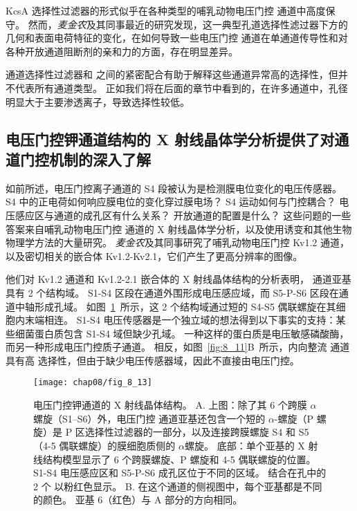 KcsA 选择性过滤器的形式似乎在各种类型的哺乳动物电压门控  通道中高度保守。
然而，\textit{麦金农}及其同事最近的研究发现，这一典型孔道选择性滤过器下方的几何和表面电荷特征的变化，在如何导致一些电压门控  通道在单通道传导性和对各种开放通道阻断剂的亲和力的方面，存在明显差异。


 通道选择性过滤器和  之间的紧密配合有助于解释这些通道异常高的选择性，但并不代表所有通道类型。
正如我们将在后面的章节中看到的，在许多通道中，孔径明显大于主要渗透离子，导致选择性较低。



\subsection{电压门控钾通道结构的 X 射线晶体学分析提供了对通道门控机制的深入了解}

如前所述，电压门控离子通道的 S4 段被认为是检测膜电位变化的电压传感器。
S4 中的正电荷如何响应膜电位的变化穿过膜电场？
S4 运动如何与门控耦合？
电压感应区与通道的成孔区有什么关系？
开放通道的配置是什么？
这些问题的一些答案来自哺乳动物电压门控  通道的 X 射线晶体学分析，以及使用诱变和其他生物物理学方法的大量研究。
\textit{麦金农}及其同事研究了哺乳动物电压门控 Kv1.2  通道，以及密切相关的嵌合体 Kv1.2-Kv2.1，它们产生了更高分辨率的图像。


他们对 Kv1.2 通道和 Kv1.2-2.1 嵌合体的 X 射线晶体结构的分析表明， 通道亚基具有 2 个结构域。
S1-S4 区段在通道外围形成电压感应域，而 S5-P-S6 区段在通道中轴形成孔域。
如图~\ref{fig:8_13}~所示，这 2 个结构域通过短的 S4-S5 偶联螺旋在其细胞内末端相连。
S1-S4 电压传感器是一个独立域的想法得到以下事实的支持：某些细菌蛋白质包含 S1-S4 域但缺少孔域。
一种这样的蛋白质是电压敏感磷酸酶，而另一种形成电压门控质子通道。
相反，如图~\ref{fig:8_11}B~所示，内向整流  通道具有高  选择性，但由于缺少电压传感器域，因此不直接由电压门控。


\begin{figure}[htbp]
	\centering
	\texttt{[image: chap08/fig\_8\_13]}
	\caption{电压门控钾通道的 X 射线晶体结构\cite{long2007atomic}。
		A. 上图：除了其 6 个跨膜 $\alpha$ 螺旋（S1–S6）外，电压门控  通道亚基还包含一个短的 $\alpha$-螺旋（P 螺旋）是 P 区选择性过滤器的一部分，以及连接跨膜螺旋 S4 和 S5（4-5 偶联螺旋）的膜细胞质侧的 $\alpha$螺旋。
		底部：单个亚基的 X 射线结构模型显示了 6 个跨膜螺旋、P 螺旋和 4-5 偶联螺旋的位置。
		S1-S4 电压感应区和 S5-P-S6 成孔区位于不同的区域。
		结合在孔中的 2 个  以粉红色显示。
		B. 在这个通道的侧视图中，每个亚基都是不同的颜色。
		亚基 6（红色）与 A 部分的方向相同。}
	\label{fig:8_13}
\end{figure}


